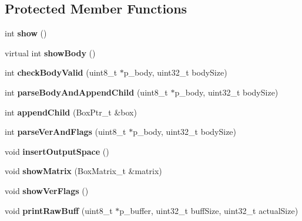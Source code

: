 \subsection*{Protected Member Functions}
\begin{DoxyCompactItemize}
\item 
\mbox{\label{classmp4_parser_1_1_box_a4695522b0b48e837ec8957f1c81a84fb}} 
int {\bfseries show} ()
\item 
\mbox{\label{classmp4_parser_1_1_box_ae3ac92a6215c86664be6e0a76c608bd0}} 
virtual int {\bfseries show\+Body} ()
\item 
\mbox{\label{classmp4_parser_1_1_box_a92cb4db9a720eaedd20727eb9deb1bbf}} 
int {\bfseries check\+Body\+Valid} (uint8\+\_\+t $\ast$p\+\_\+body, uint32\+\_\+t body\+Size)
\item 
\mbox{\label{classmp4_parser_1_1_box_aab27a49bf72791f10af83a2bde806765}} 
int {\bfseries parse\+Body\+And\+Append\+Child} (uint8\+\_\+t $\ast$p\+\_\+body, uint32\+\_\+t body\+Size)
\item 
\mbox{\label{classmp4_parser_1_1_box_ad14c58ccda8ea5205cfb51bb0981b3bc}} 
int {\bfseries append\+Child} (Box\+Ptr\+\_\+t \&box)
\item 
\mbox{\label{classmp4_parser_1_1_box_a4e171a230d24f76d9c074516cee0386f}} 
int {\bfseries parse\+Ver\+And\+Flags} (uint8\+\_\+t $\ast$p\+\_\+body, uint32\+\_\+t body\+Size)
\item 
\mbox{\label{classmp4_parser_1_1_box_a57c0c875aec8562872696b6c66f67021}} 
void {\bfseries insert\+Output\+Space} ()
\item 
\mbox{\label{classmp4_parser_1_1_box_a3ba346fb025f0b57b7ea0e4d7a6ea617}} 
void {\bfseries show\+Matrix} (Box\+Matrix\+\_\+t \&matrix)
\item 
\mbox{\label{classmp4_parser_1_1_box_aac566f926f43ea4b13c04b04abb4b14d}} 
void {\bfseries show\+Ver\+Flags} ()
\item 
\mbox{\label{classmp4_parser_1_1_box_ab1de06961c5314b8fdfadfc3a0548a82}} 
void {\bfseries print\+Raw\+Buff} (uint8\+\_\+t $\ast$p\+\_\+buffer, uint32\+\_\+t buff\+Size, uint32\+\_\+t actual\+Size)
\end{DoxyCompactItemize}
